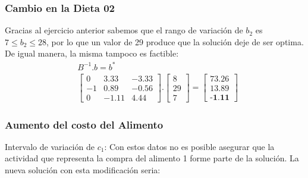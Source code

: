 \begin{homeworkProblem}
\subsubsection{Cambio en la Dieta 02}
Gracias al ejercicio anterior sabemos que el rango de variación de $b_2$ es $7 \le b_2 \le 28$, por lo que un valor de 29 produce que la solución deje de ser optima. De igual manera, la misma tampoco es factible:
\begin{align*}
  &B^{-1}.b = b^{*} \\
  &\begin{bmatrix}
   0 & 3.33 & -3.33 \\
   -1 & 0.89 & -0.56 \\
   0 & -1.11 & 4.44 
  \end{bmatrix}.
  \begin{bmatrix}
   8 \\
   29 \\
   7
  \end{bmatrix} =
  \begin{bmatrix}
   73.26 \\
   13.89 \\
   \textbf{-1.11}
  \end{bmatrix}
\end{align*}

\subsubsection{Aumento del costo del Alimento}
Intervalo de variación de $c_1$: 
Con estos datos no es posible asegurar que la actividad que representa la compra del alimento 1 forme parte de la solución. La nueva solución con esta modificación seria: 


\end{homeworkProblem}
